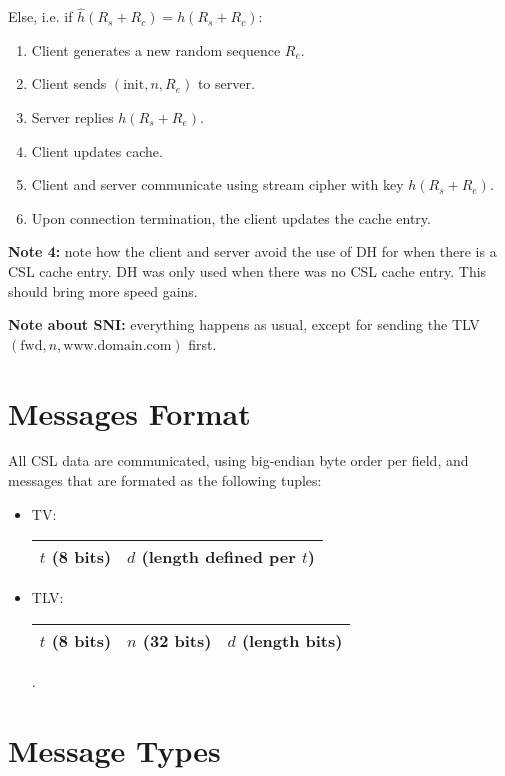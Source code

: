 \documentclass{article}
\begin{document}
\begin{enumerate}
\begin{enumerate}
        Else, i.e. if $\hat h(R_s + R_c) = h(R_s + R_c)$:
            \begin{enumerate}
                \item Client generates a new random sequence $R_e$.
                \item Client sends $(\text{init}, n, R_e)$ to server.
                \item Server replies $h(R_s + R_e)$.
                \item Client updates cache.
                \item Client and server communicate using stream cipher with
                key $h(R_s+R_e)$.
                \item Upon connection termination, the client updates the cache
                entry.
            \end{enumerate}
        \textbf{Note 4:} note how the client and server avoid the use of DH for
        when there is a CSL cache entry. DH was only used when there was no CSL
        cache entry. This should bring more speed gains.
    \end{enumerate}
\end{enumerate}

\textbf{Note about SNI:} everything happens as usual, except for sending the
TLV $(\text{fwd}, n, \text{www.domain.com})$ first.

\section{Messages Format}
All CSL data are communicated, using big-endian byte order per field, and
messages that are formated as the following tuples:
\begin{itemize}
    \item TV: 
        \begin{tabular}{|l|l|}\hline
            $t$ (8 bits) & $d$ (length defined per $t$)\\\hline
        \end{tabular}
    \item TLV:
        \begin{tabular}{|l|l|l|}\hline
            $t$ (8 bits) & $n$ (32 bits) & $d$ (length bits)\\\hline
        \end{tabular}.
\end{itemize}

\section{Message Types}
\end{document}
